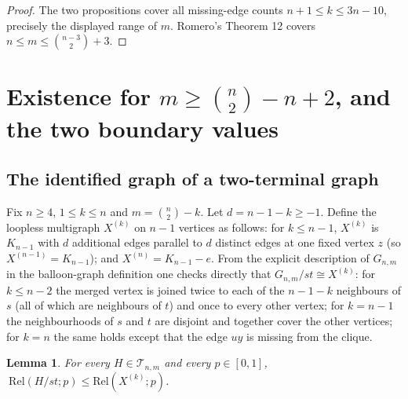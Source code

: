 \documentclass[
  11pt,
]{article}
\newtheorem{lemma}[theorem]{Lemma}
\theoremstyle{definition}
\theoremstyle{remark}
\begin{document}
\begin{proof}
The two propositions cover all missing-edge counts $n+1\le k\le3n-10$, precisely the displayed range of $m$. Romero's Theorem 12 covers $n\le m\le\binom{n-3}2+3$.
\end{proof}

\section{\texorpdfstring{Existence for \(m\ge\binom n2-n+2\), and the
two boundary
values}{Existence for m\textbackslash ge\textbackslash binom n2-n+2, and the two boundary values}}\label{existence-for-mgebinom-n2-n2-and-the-two-boundary-values}

\subsection{The identified graph of a two-terminal
graph}\label{the-identified-graph-of-a-two-terminal-graph}

Fix \(n\ge 4\), \(1\le k\le n\) and \(m=\binom n2-k\). Let
\(d=n-1-k\ge-1\). Define the loopless multigraph \(X^{(k)}\) on \(n-1\)
vertices as follows: for \(k\le n-1\), \(X^{(k)}\) is \(K_{n-1}\) with
\(d\) additional edges parallel to \(d\) distinct edges at one fixed
vertex \(z\) (so \(X^{(n-1)}=K_{n-1}\)); and \(X^{(n)}=K_{n-1}-e\). From
the explicit description of \(G_{n,m}\) in the balloon-graph definition
one checks directly that \(G_{n,m}/st\cong X^{(k)}\): for \(k\le n-2\)
the merged vertex is joined twice to each of the \(n-1-k\) neighbours of
\(s\) (all of which are neighbours of \(t\)) and once to every other
vertex; for \(k=n-1\) the neighbourhoods of \(s\) and \(t\) are disjoint
and together cover the other vertices; for \(k=n\) the same holds except
that the edge \(uy\) is missing from the clique.

\begin{lemma}\label{lem:identified}
For every $H\in\mathcal T_{n,m}$ and every $p\in[0,1]$, $\ \mathrm{Rel}(H/st;p)\le\mathrm{Rel}(X^{(k)};p)$.
\end{lemma}
\end{document}
